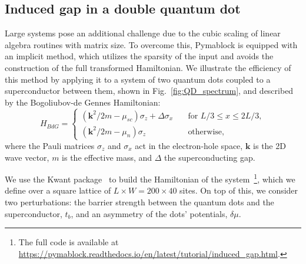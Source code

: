 \subsection{Induced gap in a double quantum dot}
\label{sec:induced_gap}

Large systems pose an additional challenge due to the cubic scaling of linear algebra routines with matrix size.
To overcome this, Pymablock is equipped with an implicit method, which utilizes the sparsity of the input and avoids the construction of the full transformed Hamiltonian.
We illustrate the efficiency of this method by applying it to a system of two quantum dots coupled to a superconductor between them, shown in
Fig.~\ref{fig:QD_spectrum}, and described by the Bogoliubov-de Gennes Hamiltonian:
%
\begin{equation}
    H_{BdG} =
    \begin{cases}
        (\mathbf{k}^2/2m - \mu_{sc}) \sigma_z + \Delta \sigma_x \quad & \text{for } L/3 \leq x \leq 2L/3, \\
        (\mathbf{k}^2/2m - \mu_n) \sigma_z \quad & \text{otherwise},
    \end{cases}
\end{equation}
where the Pauli matrices $\sigma_z$ and $\sigma_x$ act in the electron-hole space, $\mathbf{k}$ is the 2D wave vector, $m$ is the effective mass, and $\Delta$ the superconducting gap.

We use the Kwant package~\cite{Groth_2014} to build the Hamiltonian of the system~\footnote{The full code is available at \url{https://pymablock.readthedocs.io/en/latest/tutorial/induced_gap.html}.}, which we define over a square lattice of $L \times W = 200 \times 40$ sites.
On top of this, we consider two perturbations: the barrier strength between the quantum dots and the superconductor, $t_b$, and an asymmetry of the dots' potentials, $\delta \mu$.

